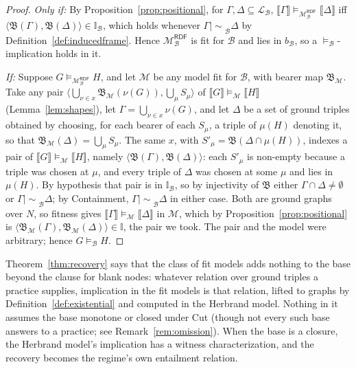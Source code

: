 \documentclass[12pt]{article}
\newcommand{\I}{\mathbb{I}}
\newcommand{\imp}{\mathrel{\mid\!\sim}}
\theoremstyle{definition}
\newcommand{\tuple}[1]{\langle #1 \rangle}
\newcommand{\sem}[1]{\llbracket #1 \rrbracket}  %
\newcommand{\bmap}{\mathfrak{B}}  %
\newcommand{\Mcal}{\mathcal{M}}   %
\newcommand{\Bcal}{\mathcal{B}}   %
\begin{document}
\begin{proof}
\textit{Only if:} By Proposition~\ref{prop:positional}, for $\Gamma, \Delta \subseteq \mathcal{L}_{\Bcal}$, $\sem{\Gamma} \models_{\Mcal_{\Bcal}^{\mathsf{RDF}}} \sem{\Delta}$ iff $\tuple{\bmap(\Gamma), \bmap(\Delta)} \in \I_{\Bcal}$, which holds whenever $\Gamma \imp_{\Bcal} \Delta$ by Definition~\ref{def:inducedframe}. Hence $\Mcal_{\Bcal}^{\mathsf{RDF}}$ is fit for $\Bcal$ and lies in $b_{\Bcal}$, so a $\models_{\Bcal}$-implication holds in it.

\textit{If:} Suppose $G \models_{\Mcal_{\Bcal}^{\mathsf{RDF}}} H$, and let $\Mcal$ be any model fit for $\Bcal$, with bearer map $\bmap_{\Mcal}$. Take any pair $\tuple{\bigcup_{\nu \in x}\bmap_{\Mcal}(\nu(G)), \bigcup_{\mu} S_{\mu}}$ of $\sem{G} \models_{\Mcal} \sem{H}$ (Lemma~\ref{lem:shapes}), let $\Gamma = \bigcup_{\nu \in x} \nu(G)$, and let $\Delta$ be a set of ground triples obtained by choosing, for each bearer of each $S_{\mu}$, a triple of $\mu(H)$ denoting it, so that $\bmap_{\Mcal}(\Delta) = \bigcup_{\mu} S_{\mu}$. The same $x$, with $S'_{\mu} = \bmap(\Delta \cap \mu(H))$, indexes a pair of $\sem{G} \models_{\Mcal} \sem{H}$, namely $\tuple{\bmap(\Gamma), \bmap(\Delta)}$: each $S'_{\mu}$ is non-empty because a triple was chosen at $\mu$, and every triple of $\Delta$ was chosen at some $\mu$ and lies in $\mu(H)$. By hypothesis that pair is in $\I_{\Bcal}$, so by injectivity of $\bmap$ either $\Gamma \cap \Delta \neq \emptyset$ or $\Gamma \imp_{\Bcal} \Delta$; by Containment, $\Gamma \imp_{\Bcal} \Delta$ in either case. Both are ground graphs over $N$, so fitness gives $\sem{\Gamma} \models_{\Mcal} \sem{\Delta}$ in $\Mcal$, which by Proposition~\ref{prop:positional} is $\tuple{\bmap_{\Mcal}(\Gamma), \bmap_{\Mcal}(\Delta)} \in \I$, the pair we took. The pair and the model were arbitrary; hence $G \models_{\Bcal} H$.
\end{proof}

Theorem~\ref{thm:recovery} says that the class of fit models adds nothing to the base beyond the clause for blank nodes: whatever relation over ground triples a practice supplies, implication in the fit models is that relation, lifted to graphs by Definition~\ref{def:existential} and computed in the Herbrand model. Nothing in it assumes the base monotone or closed under Cut (though not every such base answers to a practice; see Remark~\ref{rem:omission}). When the base is a closure, the Herbrand model's implication has a witness characterization, and the recovery becomes the regime's own entailment relation.
\end{document}
